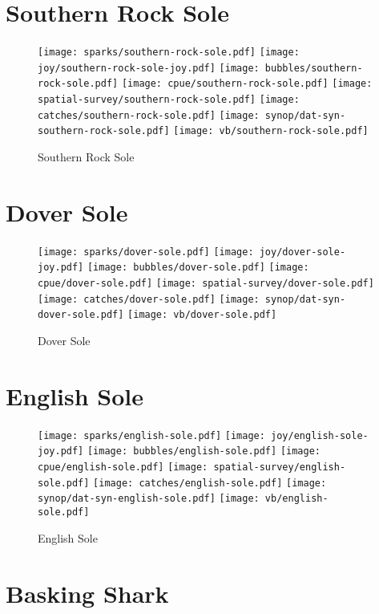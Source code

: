 \section{Southern Rock Sole}

\begin{figure}[htbp]
\centering
\texttt{[image: sparks/southern-rock-sole.pdf]}
\texttt{[image: joy/southern-rock-sole-joy.pdf]}
\texttt{[image: bubbles/southern-rock-sole.pdf]}
\texttt{[image: cpue/southern-rock-sole.pdf]}
\texttt{[image: spatial-survey/southern-rock-sole.pdf]}
\texttt{[image: catches/southern-rock-sole.pdf]}
\texttt{[image: synop/dat-syn-southern-rock-sole.pdf]}
\texttt{[image: vb/southern-rock-sole.pdf]}
\caption{Southern Rock Sole}
\end{figure}
\clearpage
\section{Dover Sole}

\begin{figure}[htbp]
\centering
\texttt{[image: sparks/dover-sole.pdf]}
\texttt{[image: joy/dover-sole-joy.pdf]}
\texttt{[image: bubbles/dover-sole.pdf]}
\texttt{[image: cpue/dover-sole.pdf]}
\texttt{[image: spatial-survey/dover-sole.pdf]}
\texttt{[image: catches/dover-sole.pdf]}
\texttt{[image: synop/dat-syn-dover-sole.pdf]}
\texttt{[image: vb/dover-sole.pdf]}
\caption{Dover Sole}
\end{figure}
\clearpage
\section{English Sole}

\begin{figure}[htbp]
\centering
\texttt{[image: sparks/english-sole.pdf]}
\texttt{[image: joy/english-sole-joy.pdf]}
\texttt{[image: bubbles/english-sole.pdf]}
\texttt{[image: cpue/english-sole.pdf]}
\texttt{[image: spatial-survey/english-sole.pdf]}
\texttt{[image: catches/english-sole.pdf]}
\texttt{[image: synop/dat-syn-english-sole.pdf]}
\texttt{[image: vb/english-sole.pdf]}
\caption{English Sole}
\end{figure}
\clearpage
\section{Basking Shark}

